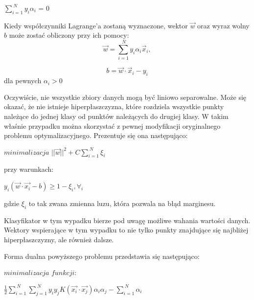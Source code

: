 \documentclass[[10pt,a4paper]{article}
\begin{document}
\vspace{5mm}\centerline {$\sum_{i=1}^{\ N} y_i \alpha_i$ = 0 }

\vspace{5mm}

Kiedy współczynniki Lagrange'a zostaną wyznaczone, wektor $\overrightarrow{w}$ oraz wyraz wolny $b$ może zostać obliczony przy ich pomocy:
\begin{equation}
\overrightarrow{w} = \sum_{i=1}^{\ N} y_i \alpha_i \overrightarrow{x}_i,  
\end{equation}

\begin{equation}
b = \overrightarrow{w} \cdot \overrightarrow{x}_i - y_i  
\end{equation}
dla pewnych  $\alpha_i > 0 $

\vspace{5mm}Oczywiście, nie wszystkie zbiory danych mogą być liniowo separowalne. Może się okazać, że nie istnieje hiperpłaszczyzna, które rozdziela wszystkie punkty należące do jednej klasy od punktów należących do drugiej klasy. W takim właśnie przypadku można skorzystać z pewnej modyfikacji oryginalnego problemu optymalizacyjnego. Prezentuje się ona następująco: 

\vspace{5mm}\centerline {$minimalizacja$  $||\overrightarrow{w}||^2+ C \sum_{i=1}^{\ N} \xi_i$}

\vspace{5mm} przy warunkach:

\vspace{5mm}\centerline {$y_i(\overrightarrow{w} \cdot \overrightarrow{x_i} - b)\geq 1 - \xi_i, \forall_i$}

\vspace{5mm}gdzie $\xi_i$ to tak zwana zmienna luzu, która pozwala na błąd marginesu. 

\vspace{5mm} Klasyfikator w tym wypadku bierze pod uwagę możliwe wahania wartości danych. Wektory wspierające w tym wypadku to nie tylko punkty znajdujące się najbliżej hiperpłaszczyzny, ale również dalsze. 

\vspace{5mm}Forma dualna powyższego problemu przedstawia się następująco:

\vspace{5mm}\centerline {$minimalizacja$  $funkcji:$}

\vspace{5mm}\centerline {$\frac{1}{2} \sum_{i=1}^{\ N} \sum_{j=1}^{\ N} y_i y_j  K(\overrightarrow{x_i} \cdot\overrightarrow{x_j}) \alpha_i \alpha_j - \sum_{i=1}^{\ N} \alpha_i$}
  
\end{document}
